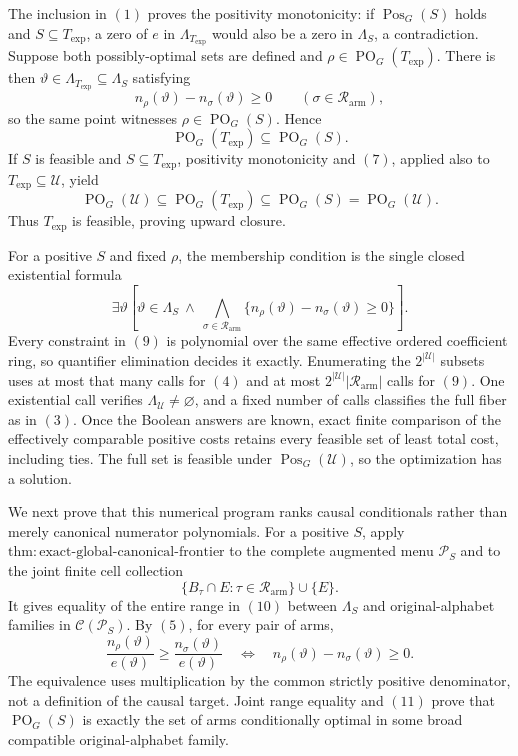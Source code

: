 The inclusion in \((1)\) proves the positivity monotonicity: if
\(\operatorname{Pos}_G(S)\) holds and \(S\subseteq T_{\mathrm{exp}}\), a zero of
\(e\) in \(\Lambda_{T_{\mathrm{exp}}}\) would also be a zero in \(\Lambda_S\), a
contradiction.  Suppose both possibly-optimal sets are defined and
\(\rho\in\operatorname{PO}_G(T_{\mathrm{exp}})\).  There is then
\(\vartheta\in\Lambda_{T_{\mathrm{exp}}}\subseteq\Lambda_S\) satisfying
\[
n_\rho(\vartheta)-n_\sigma(\vartheta)\geq0
\qquad(\sigma\in\mathcal R_{\mathrm{arm}}),
\tag{6}
\]
so the same point witnesses \(\rho\in\operatorname{PO}_G(S)\).  Hence
\[
\operatorname{PO}_G(T_{\mathrm{exp}})
\subseteq\operatorname{PO}_G(S).
\tag{7}
\]
If \(S\) is feasible and \(S\subseteq T_{\mathrm{exp}}\), positivity monotonicity
and \((7)\), applied also to \(T_{\mathrm{exp}}\subseteq\mathcal U\), yield
\[
\operatorname{PO}_G(\mathcal U)
\subseteq\operatorname{PO}_G(T_{\mathrm{exp}})
\subseteq\operatorname{PO}_G(S)
=\operatorname{PO}_G(\mathcal U).
\tag{8}
\]
Thus \(T_{\mathrm{exp}}\) is feasible, proving upward closure.

For a positive \(S\) and fixed \(\rho\), the membership condition is the single
closed existential formula
\[
\exists\vartheta\left[
\vartheta\in\Lambda_S\ \wedge\
\bigwedge_{\sigma\in\mathcal R_{\mathrm{arm}}}
\{n_\rho(\vartheta)-n_\sigma(\vartheta)\geq0\}
\right].
\tag{9}
\]
Every constraint in \((9)\) is polynomial over the same effective ordered
coefficient ring, so quantifier elimination decides it exactly.  Enumerating the
\(2^{|\mathcal U|}\) subsets uses at most that many calls for \((4)\) and at most
\(2^{|\mathcal U|}|\mathcal R_{\mathrm{arm}}|\) calls for \((9)\).  One existential
call verifies \(\Lambda_{\mathcal U}\ne\varnothing\), and a fixed number of calls
classifies the full fiber as in \((3)\).  Once the Boolean answers are known, exact
finite comparison of the effectively comparable positive costs retains every
feasible set of least total cost, including ties.  The full set is feasible under
\(\operatorname{Pos}_G(\mathcal U)\), so the optimization has a solution.

We next prove that this numerical program ranks causal conditionals rather than
merely canonical numerator polynomials.  For a positive \(S\), apply
\(\mathrm{thm:exact\text{-}global\text{-}canonical\text{-}frontier}\) to the complete
augmented menu \(\mathcal P_S\) and to the joint finite cell collection
\[
\{B_\tau\cap E:\tau\in\mathcal R_{\mathrm{arm}}\}\cup\{E\}.
\tag{10}
\]
It gives equality of the entire range in \((10)\) between \(\Lambda_S\) and
original-alphabet families in \(\mathcal C(\mathcal P_S)\).  By \((5)\), for every
pair of arms,
\[
\frac{n_\rho(\vartheta)}{e(\vartheta)}
\geq
\frac{n_\sigma(\vartheta)}{e(\vartheta)}
\quad\Longleftrightarrow\quad
n_\rho(\vartheta)-n_\sigma(\vartheta)\geq0.
\tag{11}
\]
The equivalence uses multiplication by the common strictly positive denominator,
not a definition of the causal target.  Joint range equality and \((11)\) prove that
\(\operatorname{PO}_G(S)\) is exactly the set of arms conditionally optimal in some
broad compatible original-alphabet family.

